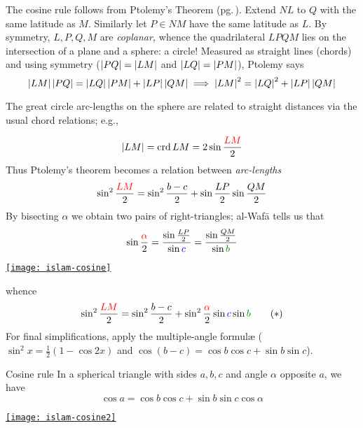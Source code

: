 The cosine rule follows from Ptolemy's Theorem (pg.\,\pageref{pg:ptolemythm}). Extend $NL$ to $Q$ with the same latitude as $M$. Similarly let $P\in NM$ have the same latitude as $L$. By symmetry, $L,P,Q,M$ are \emph{coplanar,} whence the quadrilateral $LPQM$ lies on the intersection of a plane and a sphere: a circle! Measured as straight lines (chords) and using symmetry ($\left| PQ\right|=\left| LM\right|$ and $\left| LQ\right|=\left| PM\right|$), Ptolemy says
\[
	\left| LM\right|\left| PQ\right|=\left| LQ\right|\left| PM\right|+\left| LP\right|\left| QM\right| \implies \left| LM\right|^2=\left| LQ\right|^2+\left| LP\right|\left| QM\right|
\]
\goodbreak

The great circle arc-lengths on the sphere are related to straight distances via the usual chord relations; e.g.,\par
\begin{minipage}[t]{0.65\linewidth}\vspace{-5pt}
	\[
		\left| LM\right|=\operatorname{crd} LM=2\sin\frac{\textcolor{red}{LM}}2
	\]
	Thus Ptolemy's theorem becomes a relation between \emph{arc-lengths}
	\[
		\sin^2\frac{\textcolor{red}{LM}}2=\sin^2\frac{b-c}2+\sin\frac{LP}2\sin\frac{QM}2
	\]
	By bisecting $\alpha$ we obtain two pairs of right-triangles; al-Wafā tells us that
	\[
		\sin\frac{\textcolor{red}{\alpha}}2=\frac{\sin\frac{LP}2}{\sin \textcolor{blue}{c}}=\frac{\sin\frac{QM}2}{\sin \textcolor{Green}{b}}
	\]
\end{minipage}
\hfill
\begin{minipage}[t]{0.34\linewidth}\vspace{0pt}
	\flushright
	\href{http://math.uci.edu/~ndonalds/math184/islam-cosine.html}{\texttt{[image: islam-cosine]}}
\end{minipage}
\bigbreak

\begin{minipage}[t]{0.7\linewidth}\vspace{0pt}
	whence
	\[
		\sin^2\frac{\textcolor{red}{LM}}2=\sin^2\frac{b-c}2+\sin^2\frac{\textcolor{red}{\alpha}}2\sin \textcolor{blue}{c}\sin \textcolor{Green}{b}\tag*{($\ast$)}
	\]
	For final simplifications, apply the multiple-angle formulæ ($\sin^2x=\frac 12(1-\cos 2x)$ and $\cos(b-c)=\cos b\cos c+\sin b\sin c$).

	\begin{cor*}{Cosine rule}{}
	In a spherical triangle with sides $a,b,c$ and angle $\alpha$ opposite $a$, we have
	\[
		\cos a=\cos b\cos c+\sin b\sin c\cos\alpha
	\]
	\end{cor*}

\end{minipage}
\hfill
\begin{minipage}[t]{0.29\linewidth}\vspace{-10pt}
	\flushright
	\href{http://math.uci.edu/~ndonalds/math184/islam-cosine2.html}{\texttt{[image: islam-cosine2]}}
\end{minipage}
\bigbreak


